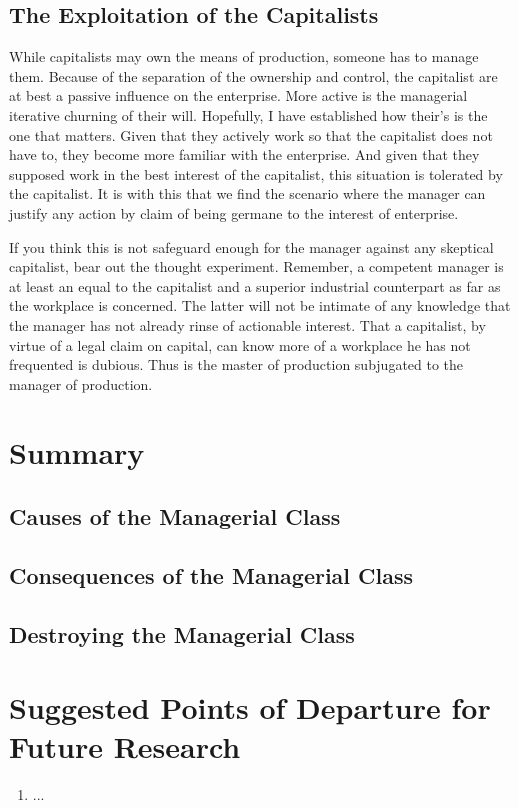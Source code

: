 \documentclass[12pt]{article}
\begin{document}
\subsection{The Exploitation of the Capitalists}
While capitalists may own the means of production, someone has to manage them.
Because of the separation of the ownership and control, the capitalist are at best a passive influence on the enterprise.
More active is the managerial iterative churning of their will.
Hopefully, I have established how their's is the one that matters.
Given that they actively work so that the capitalist does not have to, they become more familiar with the enterprise.
And given that they supposed work in the best interest of the capitalist, this situation is tolerated by the capitalist.
It is with this that we find the scenario where the manager can justify any action by claim of being germane to the interest of enterprise.

If you think this is not safeguard enough for the manager against any skeptical capitalist, bear out the thought experiment.
Remember, a competent manager is at least an equal to the capitalist and a superior industrial counterpart as far as the workplace is concerned.
The latter will not be intimate of any knowledge that the manager has not already rinse of actionable interest.
That a capitalist, by virtue of a legal claim on capital, can know more of a workplace he has not frequented is dubious.
Thus is the master of production subjugated to the manager of production.




\section{Summary}
\subsection{Causes of the Managerial Class}
\subsection{Consequences of the Managerial Class}
\subsection{Destroying the Managerial Class}

\section{Suggested Points of Departure for Future Research}


\begin{enumerate}
    \item ...
\end{enumerate}
\end{document}
